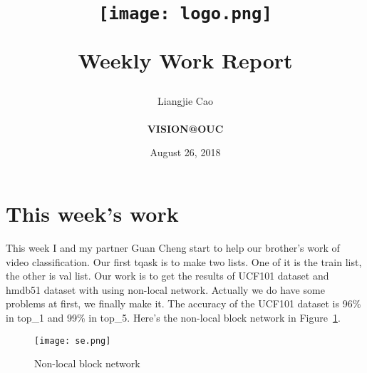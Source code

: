 \documentclass[10pt,letterpaper]{article}
\begin{document}
	\title{\begin{figure}[htbp]
			\centering
			\texttt{[image: logo.png]}\\
		\end{figure}\textbf{Weekly Work Report}}
	\author{Liangjie Cao \\
		\vspace*{0.5in} \\ 
		\textbf{VISION@OUC} \\
		\vspace*{1in}
	}
	\date{August 26, 2018}
	\maketitle
	\newpage
\section{This week's work}
This week  I and my partner Guan Cheng start to help our brother's work of video classification. Our first tqask is to make two lists. One of it is the train list, the other is val list. Our work is to get the results of UCF101 dataset and hmdb51 dataset with using non-local network. Actually we do have some problems at first, we finally make it. The accuracy of the UCF101 dataset is 96\% in top\_1 and 99\% in top\_5. Here's the non-local block network in Figure~\ref{se}.
 \begin{figure}[!htb]
 	\centering
 	\texttt{[image: se.png]}\\
 	\caption{Non-local block network}\label{se}
 \end{figure}
\end{document}
